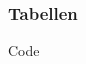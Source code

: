 \begin{frame}
    \frametitle{Tabellen}
    \begin{block}{Code}
        
    \end{block}
\end{frame}

